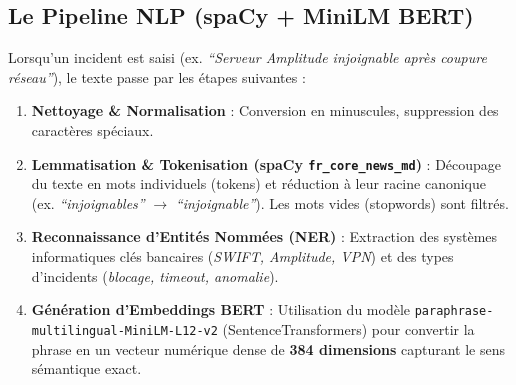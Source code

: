 \documentclass[11pt,a4paper]{article}
\begin{document}
\subsection{Le Pipeline NLP (spaCy + MiniLM BERT)}
Lorsqu'un incident est saisi (ex. \textit{``Serveur Amplitude injoignable après coupure réseau''}), le texte passe par les étapes suivantes :
\begin{enumerate}
    \item \textbf{Nettoyage \& Normalisation} : Conversion en minuscules, suppression des caractères spéciaux.
    \item \textbf{Lemmatisation \& Tokenisation (spaCy \texttt{fr\_core\_news\_md})} : Découpage du texte en mots individuels (tokens) et réduction à leur racine canonique (ex. \textit{``injoignables''} $\rightarrow$ \textit{``injoignable''}). Les mots vides (stopwords) sont filtrés.
    \item \textbf{Reconnaissance d'Entités Nommées (NER)} : Extraction des systèmes informatiques clés bancaires (\textit{SWIFT, Amplitude, VPN}) et des types d'incidents (\textit{blocage, timeout, anomalie}).
    \item \textbf{Génération d'Embeddings BERT} : Utilisation du modèle \texttt{paraphrase-multilingual-MiniLM-L12-v2} (SentenceTransformers) pour convertir la phrase en un vecteur numérique dense de \textbf{384 dimensions} capturant le sens sémantique exact.
\end{enumerate}
\end{document}
